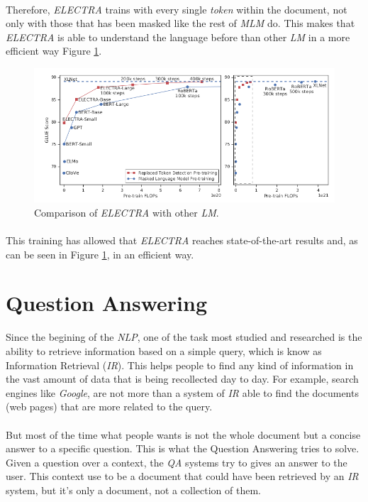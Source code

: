 \paragraph{}
Therefore, \emph{ELECTRA} trains with every single \emph{token} within the document, not only with those that has been masked like the rest of \emph{MLM} do. This makes that \emph{ELECTRA} is able to understand the language before than other \emph{LM} in a more efficient way Figure \ref{fig:compare-electra}.
\begin{figure}[h!]
	\centering
	\includegraphics[scale=0.45]{images/compareelectra}
	\caption{Comparison of \emph{ELECTRA} with other \emph{LM}.}
	\label{fig:compare-electra}
\end{figure}
\paragraph{}
This training has allowed that \emph{ELECTRA} reaches state-of-the-art results and, as can be seen in Figure \ref{fig:compare-electra}, in an efficient way. 
\section{Question Answering}
\label{sec:QuestionAnswering}
\noindent Since the begining of the \emph{NLP}, one of the task most studied and researched is the ability to retrieve information based on a simple query, which is know as Information Retrieval (\emph{IR}). This helps people to find any kind of information in the vast amount of data that is being recollected day to day. For example, search engines like \emph{Google}, are not more than a system of \emph{IR} able to find the documents (web pages) that are more related to the query.
\paragraph{}
But most of the time what people wants is not the whole document but a concise answer to a specific question. This is what the Question Answering tries to solve. Given a question over a context, the \emph{QA} systems try to gives an answer to the user. This context use to be a document that could have been retrieved by an \emph{IR} system, but it's only a document, not a collection of them.
